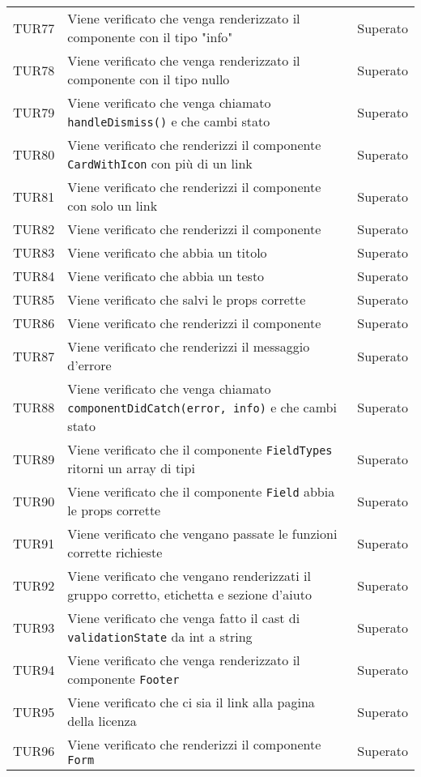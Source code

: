 \documentclass[PianoDiQualifica.tex]{subfiles}
\begin{document}
\begin{longtable}[H]{P{2cm}P{8.5cm}P{3cm}}
	TUR77 & Viene verificato che venga renderizzato il componente con il tipo "info"  & Superato \\ 
	TUR78 & Viene verificato che venga renderizzato il componente con il tipo nullo & Superato \\ 
	TUR79 & Viene verificato che venga chiamato \texttt{handleDismiss()} e che cambi stato & Superato \\ 
	TUR80 & Viene verificato che renderizzi il componente \texttt{CardWithIcon} con più di un link & Superato \\ 
	TUR81 & Viene verificato che renderizzi il componente con solo un link & Superato \\ 
	TUR82 & Viene verificato che renderizzi il componente & Superato \\ 
	TUR83 & Viene verificato che abbia un titolo & Superato \\ 
	TUR84 & Viene verificato che abbia un testo & Superato \\ 
	TUR85 & Viene verificato che salvi le props corrette & Superato \\ 
	TUR86 & Viene verificato che renderizzi il componente & Superato \\ 
	TUR87 & Viene verificato che renderizzi il messaggio d'errore & Superato \\ 
	TUR88 & Viene verificato che venga chiamato \texttt{componentDidCatch(error, info)} e che cambi stato & Superato \\ 
	TUR89 & Viene verificato che il componente \texttt{FieldTypes} ritorni un array di tipi & Superato \\ 
	TUR90 & Viene verificato che il componente \texttt{Field} abbia le props corrette & Superato \\ 
	TUR91 & Viene verificato che vengano passate le funzioni corrette richieste & Superato \\ 
	TUR92 & Viene verificato che vengano renderizzati il gruppo corretto, etichetta e sezione d'aiuto & Superato \\ 
	TUR93 & Viene verificato che venga fatto il cast di \texttt{validationState} da int a string & Superato \\ 
	TUR94 & Viene verificato che venga renderizzato il componente \texttt{Footer} & Superato \\ 
	TUR95 & Viene verificato che ci sia il link alla pagina della licenza & Superato \\ 
	TUR96 & Viene verificato che renderizzi il componente \texttt{Form} & Superato \\ 

\end{longtable}
\end{document}
